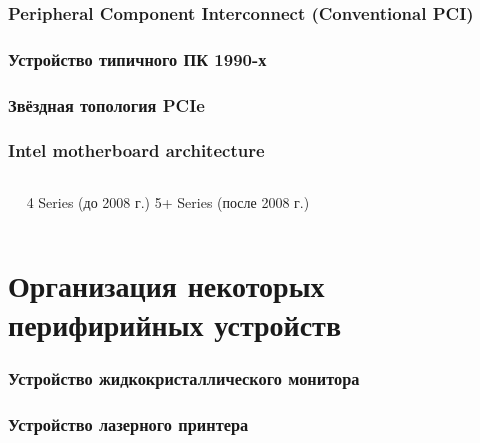 \begin{frame}
\frametitle{Peripheral Component Interconnect (Conventional PCI)}
\end{frame}

\begin{frame}
\frametitle{Устройство типичного ПК 1990-х}
\end{frame}

\begin{frame}
\frametitle{Звёздная топология PCIe}
\end{frame}

\begin{frame}
\frametitle{Intel motherboard architecture}
\begin{columns}
    \column{6.3cm}
        $\quad$ 4 Series  (до 2008 г.) %
    \pause
    \column{6.3cm} %
            5+ Series  (после 2008 г.) %

\end{columns}
\end{frame}



\section{Организация некоторых перифирийных устройств}

\begin{frame}
\frametitle{Устройство жидкокристаллического монитора}
\end{frame}

\begin{frame}
\frametitle{Устройство лазерного принтера}
\end{frame}
